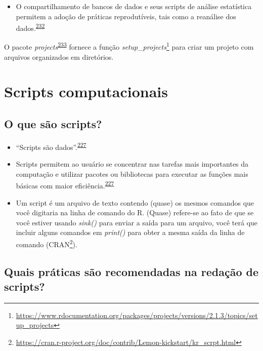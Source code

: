 \documentclass[
  a4paper,
]{book}
\providecommand{\tightlist}{%
  \setlength{\itemsep}{0pt}\setlength{\parskip}{0pt}}
\renewcommand{\href}[2]{#2\footnote{\url{#1}}}
\newenvironment{infobox}[1]
  {
  \begin{itemize}
  \renewcommand{\labelitemi}{
    \raisebox{-.7\height}[0pt][0pt]{
      {\setkeys{Gin}{width=3em,keepaspectratio}
        \texttt{[image: \#1]}}
    }
  }
  \setlength{\fboxsep}{1em}
  \begin{blackbox}
  \item
  }
  {
  \end{blackbox}
  \end{itemize}
  }
\begin{document}
\begin{itemize}
\tightlist
\item
  O compartilhamento de bancos de dados e seus scripts de análise estatística permitem a adoção de práticas reprodutíveis, tais como a reanálise dos dados.\textsuperscript{\protect\hyperlink{ref-ioannidis2014}{232}}
\end{itemize}

\begin{infobox}{images/Rlogo}
O pacote \emph{projects}\textsuperscript{\protect\hyperlink{ref-projects}{233}} fornece a função \href{https://www.rdocumentation.org/packages/projects/versions/2.1.3/topics/setup_projects}{\emph{setup\_projects}} para criar um projeto com arquivos organizados em diretórios.

\end{infobox}

\hypertarget{scripts-computacionais}{%
\section{Scripts computacionais}\label{scripts-computacionais}}

\hypertarget{o-que-suxe3o-scripts}{%
\subsection{O que são scripts?}\label{o-que-suxe3o-scripts}}

\begin{itemize}
\item
  ``Scripts são dados''.\textsuperscript{\protect\hyperlink{ref-hinsen2011}{227}}
\item
  Scripts permitem ao usuário se concentrar nas tarefas mais importantes da computação e utilizar pacotes ou bibliotecas para executar as funções mais básicas com maior eficiência.\textsuperscript{\protect\hyperlink{ref-hinsen2011}{227}}
\item
  Um script é um arquivo de texto contendo (quase) os mesmos comandos que você digitaria na linha de comando do R. (Quase) refere-se ao fato de que se você estiver usando \emph{sink()} para enviar a saída para um arquivo, você terá que incluir alguns comandos em \emph{print()} para obter a mesma saída da linha de comando (\href{https://cran.r-project.org/doc/contrib/Lemon-kickstart/kr_scrpt.html}{CRAN}).
\end{itemize}

\hypertarget{quais-pruxe1ticas-suxe3o-recomendadas-na-redauxe7uxe3o-de-scripts}{%
\subsection{Quais práticas são recomendadas na redação de scripts?}\label{quais-pruxe1ticas-suxe3o-recomendadas-na-redauxe7uxe3o-de-scripts}}
\end{document}
